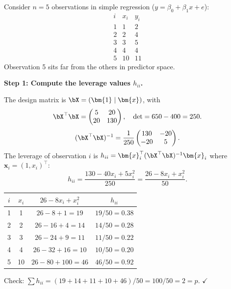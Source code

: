 \begin{example}\label{ex:leverage}
Consider $n=5$ observations in simple regression ($y = \beta_0+\beta_1 x + e$):
\[
\begin{array}{c|cc}
i & x_i & y_i \\\hline
1 & 1 & 2 \\
2 & 2 & 4 \\
3 & 3 & 5 \\
4 & 4 & 4 \\
5 & 10 & 11
\end{array}
\]
Observation 5 sits far from the others in predictor space.

\medskip\noindent\textbf{Step 1: Compute the leverage values $h_{ii}$.}

The design matrix is $\bX = (\bm{1}\mid\bm{x})$, with
\[
\bX^\top\bX = \begin{pmatrix} 5 & 20 \\ 20 & 130 \end{pmatrix},\quad
\det = 650 - 400 = 250.
\]
\[
(\bX^\top\bX)^{-1} = \frac{1}{250}\begin{pmatrix} 130 & -20 \\ -20 & 5 \end{pmatrix}.
\]
The leverage of observation $i$ is $h_{ii} = \bm{x}_i^\top(\bX^\top\bX)^{-1}\bm{x}_i$
where $\bm{x}_i = (1, x_i)^\top$:
\[
h_{ii} = \frac{130 - 40x_i + 5x_i^2}{250} = \frac{26 - 8x_i + x_i^2}{50}.
\]

\begin{center}
\renewcommand{\arraystretch}{1.2}
\begin{tabular}{c|ccc}
\toprule
$i$ & $x_i$ & $26-8x_i+x_i^2$ & $h_{ii}$ \\
\midrule
1 & 1 & $26-8+1=19$ & $19/50 = 0.38$ \\
2 & 2 & $26-16+4=14$ & $14/50 = 0.28$ \\
3 & 3 & $26-24+9=11$ & $11/50 = 0.22$ \\
4 & 4 & $26-32+16=10$ & $10/50 = 0.20$ \\
5 & 10 & $26-80+100=46$ & $46/50 = 0.92$ \\
\bottomrule
\end{tabular}
\end{center}
Check: $\sum h_{ii} = (19+14+11+10+46)/50 = 100/50 = 2 = p$. $\checkmark$


\end{example}
